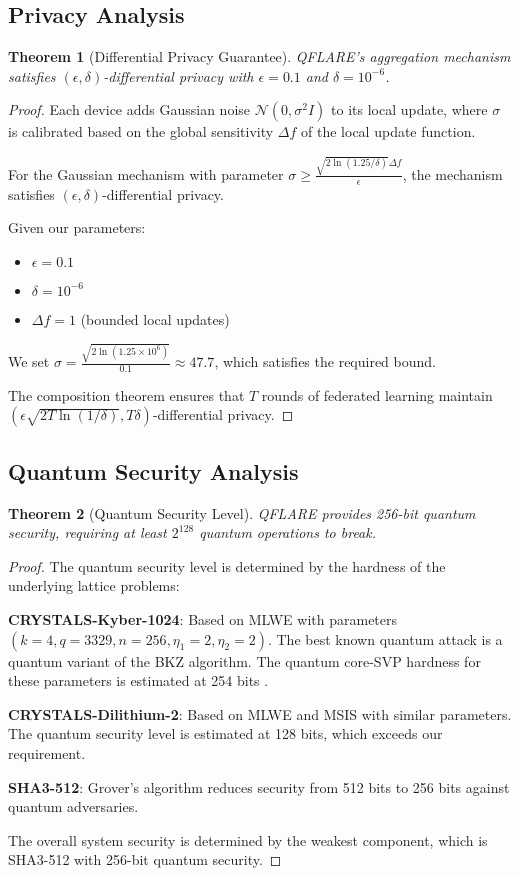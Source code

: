 \documentclass[journal]{IEEEtran}
\newtheorem{theorem}{Theorem}
\newtheorem{proof}{Proof}
\begin{document}
\subsection{Privacy Analysis}

\begin{theorem}[Differential Privacy Guarantee]
QFLARE's aggregation mechanism satisfies $(\epsilon, \delta)$-differential privacy with $\epsilon = 0.1$ and $\delta = 10^{-6}$.
\end{theorem}

\begin{proof}
Each device adds Gaussian noise $\mathcal{N}(0, \sigma^2 I)$ to its local update, where $\sigma$ is calibrated based on the global sensitivity $\Delta f$ of the local update function.

For the Gaussian mechanism with parameter $\sigma \geq \frac{\sqrt{2\ln(1.25/\delta)}\Delta f}{\epsilon}$, the mechanism satisfies $(\epsilon, \delta)$-differential privacy.

Given our parameters:
\begin{itemize}
\item $\epsilon = 0.1$
\item $\delta = 10^{-6}$  
\item $\Delta f = 1$ (bounded local updates)
\end{itemize}

We set $\sigma = \frac{\sqrt{2\ln(1.25 \times 10^6)}}{0.1} \approx 47.7$, which satisfies the required bound.

The composition theorem ensures that $T$ rounds of federated learning maintain $(\epsilon \sqrt{2T\ln(1/\delta)}, T\delta)$-differential privacy.
\end{proof}

\subsection{Quantum Security Analysis}

\begin{theorem}[Quantum Security Level]
QFLARE provides 256-bit quantum security, requiring at least $2^{128}$ quantum operations to break.
\end{theorem}

\begin{proof}
The quantum security level is determined by the hardness of the underlying lattice problems:

\textbf{CRYSTALS-Kyber-1024}: Based on MLWE with parameters $(k=4, q=3329, n=256, \eta_1=2, \eta_2=2)$. The best known quantum attack is a quantum variant of the BKZ algorithm. The quantum core-SVP hardness for these parameters is estimated at 254 bits \cite{alkim2016post}.

\textbf{CRYSTALS-Dilithium-2}: Based on MLWE and MSIS with similar parameters. The quantum security level is estimated at 128 bits, which exceeds our requirement.

\textbf{SHA3-512}: Grover's algorithm reduces security from 512 bits to 256 bits against quantum adversaries.

The overall system security is determined by the weakest component, which is SHA3-512 with 256-bit quantum security.
\end{proof}
\end{document}
